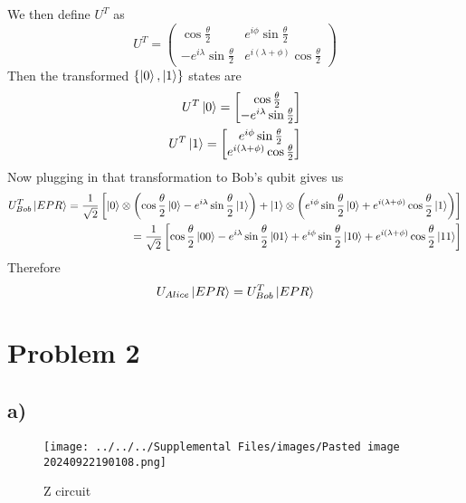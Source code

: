 \documentclass[]{article}
\begin{document}
We then define \(U^{T}\) as \[
U^{T} = 
\begin{pmatrix}
\cos \frac{\theta}{2} & e^{ i\phi  }\sin \frac{\theta}{2}\\-e^{ i\lambda  }\sin \frac{\theta}{2} 
 & e^{ i(\lambda+\phi) }\cos{\frac{\theta}{2}}
\end{pmatrix}
\] Then the transformed \(\left\{ \ket{0},\ket{1} \right\}\) states are
\[
\begin{align}
U^{T}\ket{0}  = \begin{bmatrix}
\cos \frac{\theta}{2} \\
-e^{ i\lambda }\sin \frac{\theta}{2} 
\end{bmatrix} \\
U^{T}\ket{1}  = \begin{bmatrix}
e^{ i\phi }\sin \frac{\theta}{2} \\
e^{ i(\lambda+\phi) }\cos \frac{\theta}{2}
\end{bmatrix}
\end{align}
\] Now plugging in that transformation to Bob's qubit gives us \[
\begin{align}
U^{T}_{Bob} \ket{EPR}  = \frac{1}{\sqrt{ 2 }}\left[  \ket{0} \otimes \left(\cos \frac{\theta}{2}\ket{0} - e^{ i\lambda }\sin \frac{\theta}{2}\ket{1}   \right)+\ket{1} \otimes \left( e^{ i\phi }\sin \frac{\theta}{2}\ket{0} +e^{ i(\lambda+\phi) }\cos \frac{\theta}{2}\ket{1}  \right)  \right]  \\
=\frac{1}{\sqrt{ 2 }}\left[ \cos \frac{\theta}{2}\ket{00}  -e^{ i\lambda }\sin \frac{\theta}{2}\ket{01} +e^{ i\phi }\sin \frac{\theta}{2}\ket{10} +e^{ i(\lambda+\phi) }\cos \frac{\theta}{2}\ket{11} \right] 
\end{align}
\] Therefore \[
U_{Alice}\ket{EPR}  = U_{Bob}^{T}\ket{EPR} 
\]


\newpage

\hypertarget{problem-2}{%
\section{Problem 2}\label{problem-2}}

\hypertarget{a}{%
\subsection{a)}\label{a}}

\begin{figure}
\centering
\texttt{[image: ../../../Supplemental Files/images/Pasted image 20240922190108.png]}
\caption{Z circuit}
\end{figure}
\end{document}
